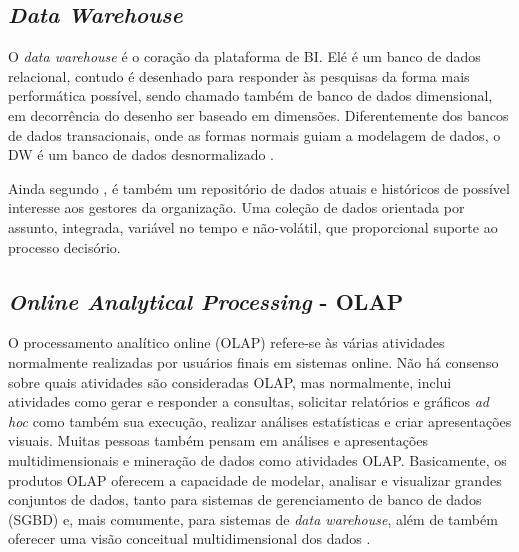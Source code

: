 \subsection{\textit{Data Warehouse}} \label{subD-datawarehouse}
O \textit{data warehouse} é o coração da plataforma de BI. Elé é um banco de dados relacional, contudo é desenhado para responder às pesquisas da forma mais performática possível, sendo chamado também de banco de dados dimensional, em decorrência do desenho ser baseado em dimensões. Diferentemente dos bancos de dados transacionais, onde as formas normais guiam a modelagem de dados, o DW é um banco de dados desnormalizado \cite{braghittoni2017}.

Ainda segundo , é também um repositório de dados atuais e históricos de possível interesse aos gestores da organização. Uma coleção de dados orientada por assunto, integrada, variável no tempo e não-volátil, que proporcional suporte ao processo decisório.
\subsection{\textit{Online Analytical Processing} - OLAP} \label{subD-olap}
O processamento analítico online (OLAP) refere-se às várias atividades normalmente realizadas por usuários finais em sistemas online. Não há consenso sobre quais atividades são consideradas OLAP, mas normalmente, inclui atividades como gerar e responder a consultas, solicitar relatórios e gráficos \textit{ad hoc} como também sua execução, realizar análises estatísticas e criar apresentações visuais. Muitas pessoas também pensam em análises e apresentações multidimensionais e mineração de dados como atividades OLAP. Basicamente, os produtos OLAP oferecem a capacidade de modelar, analisar e visualizar grandes conjuntos de dados, tanto para sistemas de gerenciamento de banco de dados (SGBD) e, mais comumente, para sistemas de \textit{data warehouse}, além de também oferecer uma visão conceitual multidimensional dos dados \cite{turban2008}.

